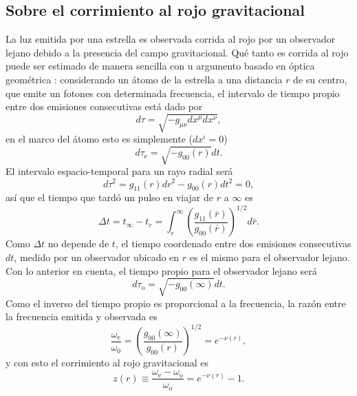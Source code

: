 \subsection*{ Sobre el corrimiento al rojo gravitacional}
\noindent La luz emitida por una estrella es observada corrida al rojo por un observador lejano debido a la presencia del campo gravitacional. Qué tanto es corrida al rojo puede ser estimado de manera sencilla con u argumento basado en óptica geométrica \cite{Glendenning2000}: considerando un átomo de la estrella a una distancia $r$ de su centro, que emite un fotones con determinada frecuencia, el intervalo de tiempo propio entre dos emisiones consecutivas está dado por
\begin{equation}
d \tau=\sqrt{-g_{\mu \nu} d x^{\mu} d x^{\nu}},
\end{equation}
en el marco del átomo esto es simplemente ($dx^i=0$)
\begin{equation}
d \tau_{\mathrm{e}}=\sqrt{-g_{00}(r)} d t.
\end{equation}
El intervalo espacio-temporal para un rayo radial será
\begin{equation}
d \tau^{2}=g_{11}(r) d r^{2} - g_{00}(r) d t^{2} = 0,
\end{equation}
así que el tiempo que tardó un pulso en viajar de $r$ a $\infty$ es
\begin{equation}\label{timeinterval}
\Delta t=t_{\infty}-t_{r}= \int_{r}^{\infty}\left(\frac{g_{11}(\bar{r})}{g_{00}(\bar{r})}\right)^{1 / 2} d \bar{r}.
\end{equation}
Como $\Delta{t}$ no depende de $t$, el tiempo coordenado entre dos emisiones consecutivas $dt$, medido por un observador ubicado en $r$ es el mismo para el observador lejano. Con lo anterior en cuenta, el tiempo propio para el observador lejano será
\begin{equation}
d \tau_{\mathrm{o}}=\sqrt{-g_{00}(\infty)} d t.
\end{equation}
Como el inverso del tiempo propio es proporcional a la frecuencia, la razón entre la frecuencia emitida y observada es
\begin{equation}
\frac{\omega_{\mathrm{e}}}{\omega_{\mathrm{0}}}=\left(\frac{g_{00}(\infty)}{g_{00}(r)}\right)^{1 / 2}=e^{-\nu(r)},
\end{equation}
y con esto el corrimiento al rojo gravitacional es
\begin{equation}
    z(r)\equiv \frac{\omega_{\mathrm{e}}-\omega_{\mathrm{o}}}{\omega_{\mathrm{o}}}  = e^{-\nu(r)}-1.
    \label{redshift}
\end{equation}

